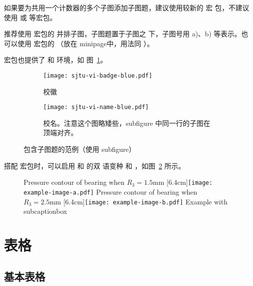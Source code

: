 \documentclass{sjtureport}
\begin{document}
如果要为共用一个计数器的多个子图添加子图题，建议使用较新的 宏
包，不建议使用  或  等宏包。

推荐使用  宏包的  并排子图，子图题置于子图之
下，子图号用 a)、b) 等表示。也可以使用  宏包的 
（放在 minipage中，用法同 ）。

 宏包也提供了  和  环境，如
图~\ref{fig:subfigure}。

\begin{figure}[!htp]
	\centering
	\begin{subfigure}{0.3\textwidth}
	\centering
	\texttt{[image: sjtu-vi-badge-blue.pdf]}
	\caption{校徽}
	\end{subfigure}
	\hspace{1cm}
	\begin{subfigure}{0.4\textwidth}
	\centering
	\texttt{[image: sjtu-vi-name-blue.pdf]}
	\caption{校名。注意这个图略矮些，subfigure 中同一行的子图在顶端对齐。}
	\end{subfigure}
	\caption{包含子图题的范例（使用 subfigure）}
	\label{fig:subfigure}
\end{figure}

搭配  宏包时，可以启用  和  的双
语变种  和 ，如图~\ref{fig:bisubcaptionbox}
所示。

\begin{figure}[!hbtp]
	\centering
					{Pressure contour of bearing when $R_3 = 1.5\text{mm}$}%
					[6.4cm]{\texttt{[image: example-image-a.pdf]}}
	\hspace{1cm}
					{Pressure contour of bearing when $R_3 = 2.5\text{mm}$}%
					[6.4cm]{\texttt{[image: example-image-b.pdf]}}
			{Example with subcaptionbox}
	\label{fig:bisubcaptionbox}
\end{figure}


\section{表格}

\subsection{基本表格}
\end{document}
